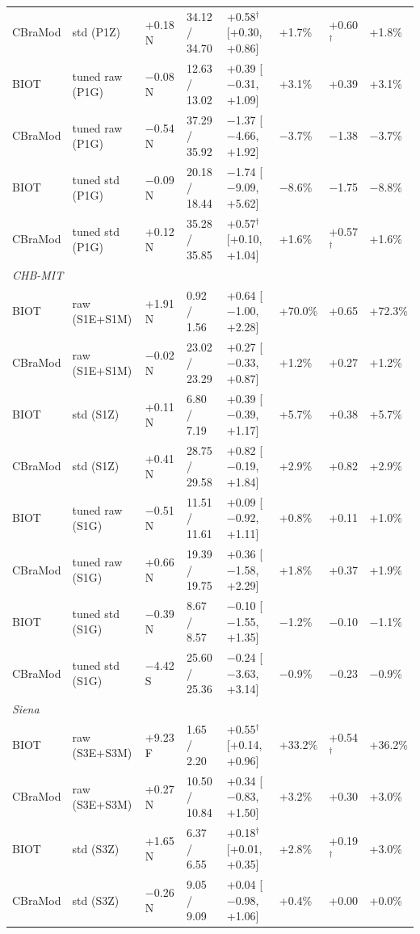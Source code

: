 \begin{table}[!htbp]
\begin{tabular}{llllllll}
CBraMod & std (P1Z) & +0.18 N & 34.12 / 34.70 & +0.58$^{\dagger}$ [+0.30, +0.86] & +1.7\% & +0.60$^{\dagger}$ & +1.8\%\\
BIOT & tuned raw (P1G) & $-$0.08 N & 12.63 / 13.02 & +0.39 [$-$0.31, +1.09] & +3.1\% & +0.39 & +3.1\%\\
CBraMod & tuned raw (P1G) & $-$0.54 N & 37.29 / 35.92 & $-$1.37 [$-$4.66, +1.92] & $-$3.7\% & $-$1.38 & $-$3.7\%\\
BIOT & tuned std (P1G) & $-$0.09 N & 20.18 / 18.44 & $-$1.74 [$-$9.09, +5.62] & $-$8.6\% & $-$1.75 & $-$8.8\%\\
CBraMod & tuned std (P1G) & +0.12 N & 35.28 / 35.85 & +0.57$^{\dagger}$ [+0.10, +1.04] & +1.6\% & +0.57$^{\dagger}$ & +1.6\%\\
\multicolumn{8}{l}{\emph{CHB-MIT}}\\
BIOT & raw (S1E+S1M) & +1.91 N & 0.92 / 1.56 & +0.64 [$-$1.00, +2.28] & +70.0\% & +0.65 & +72.3\%\\
CBraMod & raw (S1E+S1M) & $-$0.02 N & 23.02 / 23.29 & +0.27 [$-$0.33, +0.87] & +1.2\% & +0.27 & +1.2\%\\
BIOT & std (S1Z) & +0.11 N & 6.80 / 7.19 & +0.39 [$-$0.39, +1.17] & +5.7\% & +0.38 & +5.7\%\\
CBraMod & std (S1Z) & +0.41 N & 28.75 / 29.58 & +0.82 [$-$0.19, +1.84] & +2.9\% & +0.82 & +2.9\%\\
BIOT & tuned raw (S1G) & $-$0.51 N & 11.51 / 11.61 & +0.09 [$-$0.92, +1.11] & +0.8\% & +0.11 & +1.0\%\\
CBraMod & tuned raw (S1G) & +0.66 N & 19.39 / 19.75 & +0.36 [$-$1.58, +2.29] & +1.8\% & +0.37 & +1.9\%\\
BIOT & tuned std (S1G) & $-$0.39 N & 8.67 / 8.57 & $-$0.10 [$-$1.55, +1.35] & $-$1.2\% & $-$0.10 & $-$1.1\%\\
CBraMod & tuned std (S1G) & $-$4.42 S & 25.60 / 25.36 & $-$0.24 [$-$3.63, +3.14] & $-$0.9\% & $-$0.23 & $-$0.9\%\\
\multicolumn{8}{l}{\emph{Siena}}\\
BIOT & raw (S3E+S3M) & +9.23 F & 1.65 / 2.20 & +0.55$^{\dagger}$ [+0.14, +0.96] & +33.2\% & +0.54$^{\dagger}$ & +36.2\%\\
CBraMod & raw (S3E+S3M) & +0.27 N & 10.50 / 10.84 & +0.34 [$-$0.83, +1.50] & +3.2\% & +0.30 & +3.0\%\\
BIOT & std (S3Z) & +1.65 N & 6.37 / 6.55 & +0.18$^{\dagger}$ [+0.01, +0.35] & +2.8\% & +0.19$^{\dagger}$ & +3.0\%\\
CBraMod & std (S3Z) & $-$0.26 N & 9.05 / 9.09 & +0.04 [$-$0.98, +1.06] & +0.4\% & +0.00 & +0.0\%\\

\end{tabular}
\end{table}

